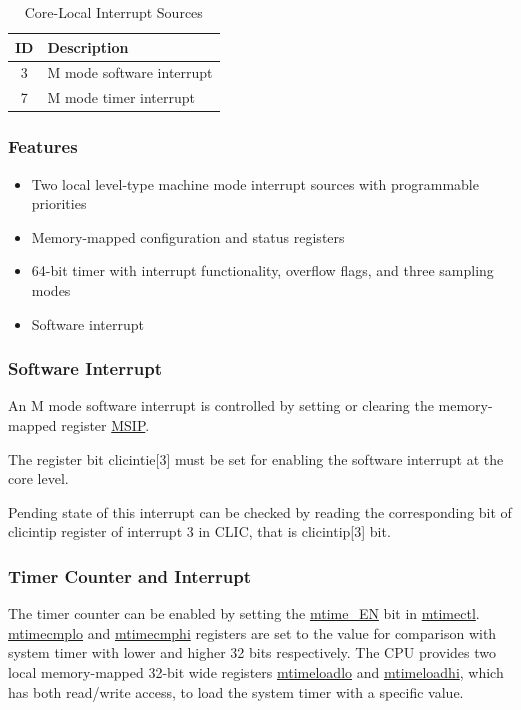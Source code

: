 \documentclass[main\_\_EN.tex]{subfiles}
\begin{document}
\begin{longtable}{ | c | l | }
\caption{Core-Local Interrupt Sources} \label{tab:riscvcpu-clint-table}
\\ \hline
\rowcolor{lightgray}
ID & Description \\ \hline
3 & M mode software interrupt \\ \hline
7 & M mode timer interrupt \\ \hline
\end{longtable}


\subsubsection{Features}
\begin{itemize}
    \item Two local level-type machine mode interrupt sources with programmable priorities
    \item Memory-mapped configuration and status registers
    \item 64-bit timer with interrupt functionality, overflow flags, and three sampling modes
    \item Software interrupt
\end{itemize}

\subsubsection{Software Interrupt}
\label{sec:riscvcpu-clint-software}

An M mode software interrupt is controlled by setting or clearing the memory-mapped register \hyperref[regdesc:CLINTMSIPREG]{MSIP}.

The register bit clicintie[3] must be set for enabling the software interrupt at the core level.

Pending state of this interrupt can be checked by reading the corresponding bit of clicintip register of interrupt 3 in CLIC, that is clicintip[3] bit.


\subsubsection{Timer Counter and Interrupt}
\label{sec:riscvcpu-clint-timer}

The timer counter can be enabled by setting the \hyperref[fielddesc:CLINTMTIMECTLEN]{mtime\_EN} bit in  \hyperref[regdesc:CLINTMTIMECTLREG]{mtimectl}.
\hyperref[regdesc:CLINTMTIMECMPLOREG]{mtimecmplo} and \hyperref[regdesc:CLINTMTIMECMPHIREG]{mtimecmphi} registers are set to the value for comparison with system timer with lower and higher 32 bits respectively.
The CPU provides two local memory-mapped 32-bit wide registers \hyperref[regdesc:CLINTMTIMELOADLOREG]{mtimeloadlo} and \hyperref[regdesc:CLINTMTIMELOADHIREG]{mtimeloadhi}, which has both read/write access, to load the system timer with a specific value.
\end{document}
